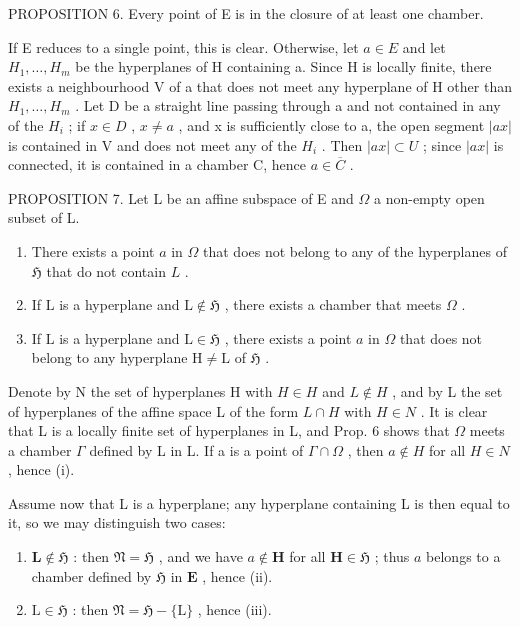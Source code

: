 PROPOSITION 6. Every point of E is in the closure of at least one chamber.

If E reduces to a single point, this is clear. Otherwise, let \(a \in E\) and let \(H_{1}, \ldots, H_{m}\) be the hyperplanes of H containing a. Since H is locally finite, there exists a neighbourhood V of a that does not meet any hyperplane of H other than \(H_{1}, \ldots, H_{m}\) . Let D be a straight line passing through a and not contained in any of the \(H_{i}\) ; if \(x \in D\) , \(x \neq a\) , and x is sufficiently close to a, the open segment \(|ax|\) is contained in V and does not meet any of the \(H_{i}\) . Then \(|ax| \subset U\) ; since \(|ax|\) is connected, it is contained in a chamber C, hence \(a \in \overline{C}\) .

PROPOSITION 7. Let L be an affine subspace of E and \(\Omega\) a non-empty open subset of L.

\begin{enumerate}
\def\labelenumi{(\roman{enumi})}
\item
  There exists a point \(a\) in \(\Omega\) that does not belong to any of the hyperplanes of \(\mathfrak{H}\) that do not contain \(L\) .
\item
  If \(\mathrm{L}\) is a hyperplane and \(\mathrm{L} \notin \mathfrak{H}\) , there exists a chamber that meets \(\Omega\) .
\item
  If \(\mathrm{L}\) is a hyperplane and \(\mathrm{L} \in \mathfrak{H}\) , there exists a point \(a\) in \(\Omega\) that does not belong to any hyperplane \(\mathrm{H} \neq \mathrm{L}\) of \(\mathfrak{H}\) .
\end{enumerate}

Denote by N the set of hyperplanes H with \(H \in H\) and \(L \notin H\) , and by L the set of hyperplanes of the affine space L of the form \(L \cap H\) with \(H \in N\) . It is clear that L is a locally finite set of hyperplanes in L, and Prop. 6 shows that \(\Omega\) meets a chamber \(\Gamma\) defined by L in L. If a is a point of \(\Gamma \cap \Omega\) , then \(a \notin H\) for all \(H \in N\) , hence (i).

Assume now that L is a hyperplane; any hyperplane containing L is then equal to it, so we may distinguish two cases:

\begin{enumerate}
\def\labelenumi{\alph{enumi})}
\item
  \(\mathbf{L} \notin \mathfrak{H}\) : then \(\mathfrak{N} = \mathfrak{H}\) , and we have \(a \notin \mathbf{H}\) for all \(\mathbf{H} \in \mathfrak{H}\) ; thus \(a\) belongs to a chamber defined by \(\mathfrak{H}\) in \(\mathbf{E}\) , hence (ii).
\item
  \(\mathrm{L} \in \mathfrak{H}\) : then \(\mathfrak{N} = \mathfrak{H} - \{\mathrm{L}\}\) , hence (iii).
\end{enumerate}

